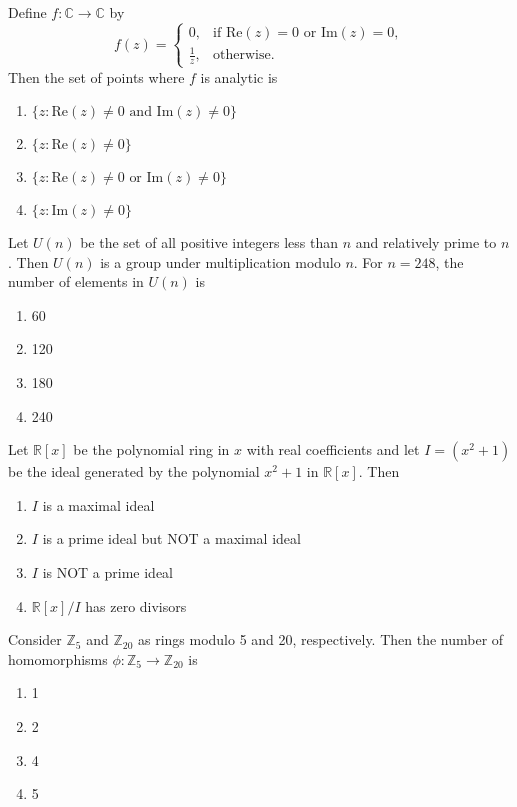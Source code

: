 \item Define $f: \mathbb{C} \to \mathbb{C}$ by
\begin{equation*}
f(z) =
\begin{cases}
0, & \text{if } \text{Re}(z) = 0 \text{ or Im}(z) = 0, \\
\frac{1}{z}, & \text{otherwise}.
\end{cases}
\end{equation*}
Then the set of points where $f$ is analytic is
\begin{enumerate}
    \item $\{z : \text{Re}(z) \neq 0 \text{ and } \text{Im}(z) \neq 0\}$
    \item $\{z : \text{Re}(z) \neq 0\}$
    \item $\{z : \text{Re}(z) \neq 0 \text{ or } \text{Im}(z) \neq 0\}$
    \item $\{z : \text{Im}(z) \neq 0\}$
\end{enumerate}
\item Let $U(n)$ be the set of all positive integers less than $n$ and relatively prime to $n$. Then $U(n)$ is a group under multiplication modulo $n$. For $n = 248$, the number of elements in $U(n)$ is
\begin{enumerate}
    \item 60
    \item 120
    \item 180
    \item 240
\end{enumerate}

\item Let $\mathbb{R}[x]$ be the polynomial ring in $x$ with real coefficients and let $I = (x^2 + 1)$ be the ideal generated by the polynomial $x^2 + 1$ in $\mathbb{R}[x]$. Then
\begin{enumerate}
    \item $I$ is a maximal ideal
    \item $I$ is a prime ideal but NOT a maximal ideal
    \item $I$ is NOT a prime ideal
    \item $\mathbb{R}[x]/I$ has zero divisors
\end{enumerate}

\item Consider $\mathbb{Z}_5$ and $\mathbb{Z}_{20}$ as rings modulo 5 and 20, respectively. Then the number of homomorphisms $\phi: \mathbb{Z}_5 \to \mathbb{Z}_{20}$ is
\begin{enumerate}
    \item 1
    \item 2
    \item 4
    \item 5
\end{enumerate}

